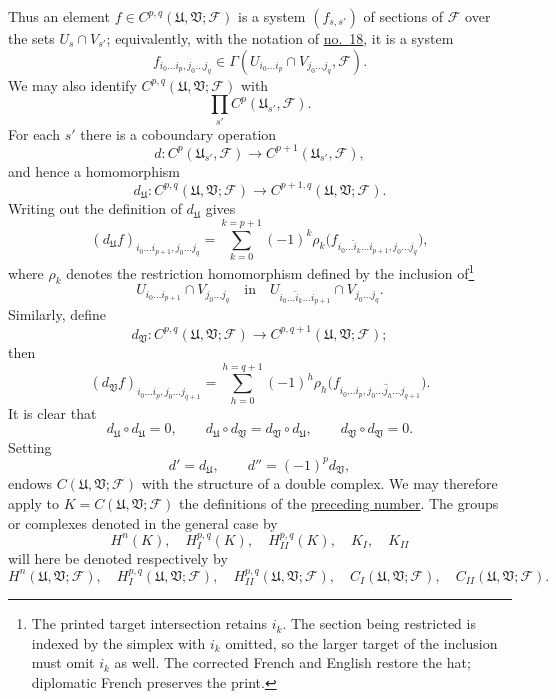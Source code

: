 Thus an element $f\in C^{p,q}(\mathfrak{U},\mathfrak{V};\mathcal{F})$ is a system $(f_{s,s'})$ of sections of $\mathcal{F}$ over the sets $U_s\cap V_{s'}$; equivalently, with the notation of \hyperref[fac:I:3:no:18]{no.~18}, it is a system
\[
f_{i_0\ldots i_p,j_0\ldots j_q}
\in\Gamma(U_{i_0\ldots i_p}\cap V_{j_0\ldots j_q},\mathcal{F}).
\]
We may also identify $C^{p,q}(\mathfrak{U},\mathfrak{V};\mathcal{F})$ with
\[
\prod_{s'}C^p(\mathfrak{U}_{s'},\mathcal{F}).
\]
For each $s'$ there is a coboundary operation
\[
d:C^p(\mathfrak{U}_{s'},\mathcal{F})
\longrightarrow C^{p+1}(\mathfrak{U}_{s'},\mathcal{F}),
\]
and hence a homomorphism
\[
d_{\mathfrak{U}}:
C^{p,q}(\mathfrak{U},\mathfrak{V};\mathcal{F})
\longrightarrow C^{p+1,q}(\mathfrak{U},\mathfrak{V};\mathcal{F}).
\]
Writing out the definition of $d_{\mathfrak{U}}$ gives
\[
(d_{\mathfrak{U}}f)_{i_0\ldots i_{p+1},j_0\ldots j_q}
=\sum_{k=0}^{k=p+1}(-1)^k
\rho_k\bigl(f_{i_0\ldots\hat{i}_k\ldots i_{p+1},j_0\ldots j_q}\bigr),
\]
where $\rho_k$ denotes the restriction homomorphism defined by the inclusion of\footnote{The printed target intersection retains $i_k$. The section being restricted is indexed by the simplex with $i_k$ omitted, so the larger target of the inclusion must omit $i_k$ as well. The corrected French and English restore the hat; diplomatic French preserves the print.}
\[
U_{i_0\ldots i_{p+1}}\cap V_{j_0\ldots j_q}
\quad\text{in}\quad
U_{i_0\ldots\hat{i}_k\ldots i_{p+1}}\cap V_{j_0\ldots j_q}.
\]
Similarly, define
\[
d_{\mathfrak{V}}:
C^{p,q}(\mathfrak{U},\mathfrak{V};\mathcal{F})
\longrightarrow C^{p,q+1}(\mathfrak{U},\mathfrak{V};\mathcal{F});
\]
then
\[
(d_{\mathfrak{V}}f)_{i_0\ldots i_p,j_0\ldots j_{q+1}}
=\sum_{h=0}^{h=q+1}(-1)^h
\rho_h\bigl(f_{i_0\ldots i_p,j_0\ldots\hat{j}_h\ldots j_{q+1}}\bigr).
\]
It is clear that
\[
d_{\mathfrak{U}}\circ d_{\mathfrak{U}}=0,
\qquad
d_{\mathfrak{U}}\circ d_{\mathfrak{V}}
=d_{\mathfrak{V}}\circ d_{\mathfrak{U}},
\qquad
d_{\mathfrak{V}}\circ d_{\mathfrak{V}}=0.
\]
Setting
\[
d'=d_{\mathfrak{U}},
\qquad d''=(-1)^p d_{\mathfrak{V}},
\]
endows $C(\mathfrak{U},\mathfrak{V};\mathcal{F})$ with the structure of a double complex. We may therefore apply to $K=C(\mathfrak{U},\mathfrak{V};\mathcal{F})$ the definitions of the \hyperref[fac:I:4:no:27]{preceding number}. The groups or complexes denoted in the general case by
\[
H^n(K),\quad H_I^{p,q}(K),\quad H_{II}^{p,q}(K),\quad K_I,\quad K_{II}
\]
will here be denoted respectively by
\[
H^n(\mathfrak{U},\mathfrak{V};\mathcal{F}),\quad
H_I^{p,q}(\mathfrak{U},\mathfrak{V};\mathcal{F}),\quad
H_{II}^{p,q}(\mathfrak{U},\mathfrak{V};\mathcal{F}),\quad
C_I(\mathfrak{U},\mathfrak{V};\mathcal{F}),\quad
C_{II}(\mathfrak{U},\mathfrak{V};\mathcal{F}).
\]


